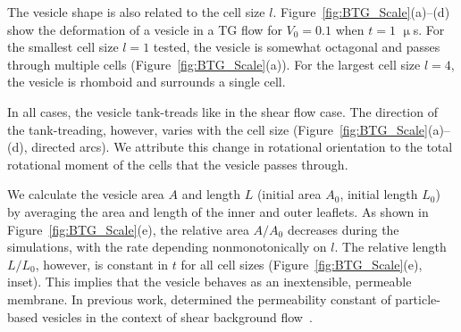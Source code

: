 \documentclass[prb,preprint,showpacs,preprintnumbers,amsmath,amssymb,longbibliography]{revtex4-1}
\begin{document}
The vesicle shape is also related to the cell size $l$.
Figure~\ref{fig:BTG_Scale}(a)--(d) show the deformation of a vesicle in
a TG flow for $V_0=0.1$ when $t = 1$ $\upmu$s. For the smallest cell
size $l = 1$ tested, the vesicle is somewhat octagonal and passes
through multiple cells (Figure~\ref{fig:BTG_Scale}(a)). For the largest
cell size $l = 4$, the vesicle is rhomboid and surrounds a single cell. 

In all cases, the vesicle tank-treads like in the shear flow case. The
direction of the tank-treading, however, varies with the cell size
(Figure~\ref{fig:BTG_Scale}(a)--(d), directed arcs). We attribute this
change in rotational orientation to the total rotational moment of the
cells that the vesicle passes through.

We calculate the vesicle area $A$ and length $L$ (initial area $A_0$,
initial length $L_0$) by averaging the area and length of the inner and
outer leaflets. As shown in Figure~\ref{fig:BTG_Scale}(e), the relative
area $A/A_0$ decreases during the simulations, with the rate depending
nonmonotonically on $l$. The relative length $L/L_0$, however, is
constant in $t$ for all cell sizes (Figure~\ref{fig:BTG_Scale}(e),
inset). This implies that the vesicle behaves as an inextensible,
permeable membrane. In previous work, \citet{Fu2022_JFM} determined the
permeability constant of particle-based vesicles in the context of shear
background flow~\cite{chabanon2017, qua-gan-you2021}.
\end{document}
